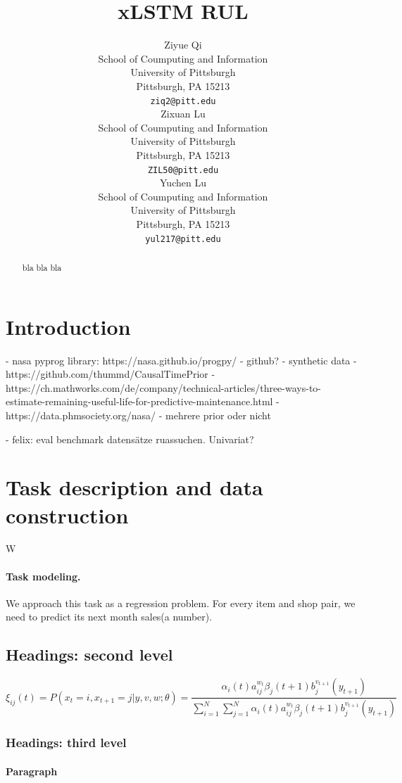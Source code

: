 \documentclass{article}
\title{xLSTM RUL}
\author{
 Ziyue Qi \\
  School of Coumputing and Information\\
  University of Pittsburgh\\
  Pittsburgh, PA 15213 \\
  \texttt{ziq2@pitt.edu} \\
   \And
 Zixuan Lu \\
  School of Coumputing and Information\\
  University of Pittsburgh\\
  Pittsburgh, PA 15213 \\
  \texttt{ZIL50@pitt.edu} \\
  \And
 Yuchen Lu \\
  School of Coumputing and Information\\
  University of Pittsburgh\\
  Pittsburgh, PA 15213 \\
  \texttt{yul217@pitt.edu} \\
}
\begin{document}
\maketitle
\begin{abstract}
bla bla bla  
\end{abstract}




\section{Introduction}
- nasa pyprog library: https://nasa.github.io/progpy/
- github?
- synthetic data
- https://github.com/thummd/CausalTimePrior
- https://ch.mathworks.com/de/company/technical-articles/three-ways-to-estimate-remaining-useful-life-for-predictive-maintenance.html
- https://data.phmsociety.org/nasa/
- mehrere prior oder nicht

- felix: eval benchmark datensätze ruassuchen. Univariat?


\section{Task description and data construction}
\label{sec:headings}
W
\paragraph{Task modeling.}
We approach this task as a regression problem. For every item and shop pair, we need to predict its next month sales(a number).

\subsection{Headings: second level}
\lipsum[5]
\begin{equation}
\xi _{ij}(t)=P(x_{t}=i,x_{t+1}=j|y,v,w;\theta)= {\frac {\alpha _{i}(t)a^{w_t}_{ij}\beta _{j}(t+1)b^{v_{t+1}}_{j}(y_{t+1})}{\sum _{i=1}^{N} \sum _{j=1}^{N} \alpha _{i}(t)a^{w_t}_{ij}\beta _{j}(t+1)b^{v_{t+1}}_{j}(y_{t+1})}}
\end{equation}

\subsubsection{Headings: third level}
\lipsum[6]

\paragraph{Paragraph}
\lipsum[7]
\end{document}
